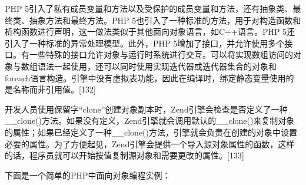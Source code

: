PHP 5引入了私有成员变量和方法以及受保护的成员变量和方法，还有抽象类、最终类、抽象方法和最终方法。PHP 5也引入了一种标准的方法，用于对构造函数和析构函数进行声明，这一做法类似于其他面向对象语言，如C++语言。PHP 5还引入了一种标准的异常处理模型。此外，PHP 5增加了接口，并允许使用多个接口。有一些特殊的接口允许对象与运行时系统进行交互。可以将实现数组访问的对象与数组语法一起使用，还可以同时使用实现迭代器或迭代器集合的对象和foreach语言构造。引擎中没有虚拟表功能，因此在编译时，绑定静态变量使用的是名称而非引用值。[132]

开发人员使用保留字“clone”创建对象副本时，Zend引擎会检查是否定义了一种__clone()方法。如果没有定义，Zend引擎就会调用默认的__clone()来复制对象的属性；如果已经定义了一种__clone()方法，引擎就会负责在创建的对象中设置必要的属性。为了方便起见，Zend引擎会提供一个导入源对象属性的函数，这样的话，程序员就可以开始按值复制源对象和需要更改的属性。[133]

下面是一个简单的PHP中面向对象编程实例：